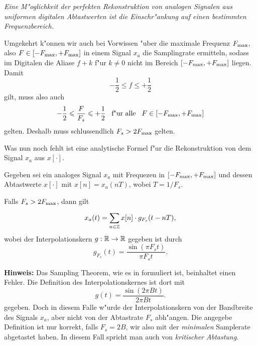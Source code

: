 \emph{Eine M"oglichkeit der perfekten Rekonstruktion von analogen Signalen aus uniformen digitalen Abtastwerten ist die Einschr"ankung auf einen bestimmten Frequenzbereich.}

Umgekehrt k"onnen wir auch bei Vorwissen "uber die maximale Frequenz $F_{\rm max}$, also $F \in [-F_{\rm max},+F_{\rm max}]$ in einem Signal $x_a$ die Samplingrate ermitteln, sodass im Digitalen die Aliase $f + k$ f"ur $k \neq 0$ nicht im Bereich $[-F_{\rm max},+F_{\rm max}]$ liegen.
Damit
\[
    -\frac 12 \leqslant f \leqslant + \frac 12
\]
gilt, muss also auch
\[
    -\frac 12 \leqslant \frac{F}{F_s} \leqslant + \frac 12 {\hspace{3mm} \text{f"ur alle} \hspace{3mm}} F \in [-F_{\rm max},+F_{\rm max}]
\]
gelten.
Deshalb muss schlussendlich $F_s > 2 F_{\rm max}$ gelten.

Was nun noch fehlt ist eine analytische Formel f"ur die Rekonstruktion von dem Signal $x_a$ aus $x[\cdot]$.
\begin{Thm}\label{stm:sampling_theorem}
Gegeben sei ein analoges Signal $x_a$ mit Frequezen in $[-F_{\rm max},+F_{\rm max}]$ und dessen Abtastwerte $x[\cdot]$ mit $x[n] = x_a(nT)$, wobei $T = 1/F_s$.

Falls $F_s > 2 F_{\rm max}$, dann gilt
\begin{equation}\label{eq:sampling_theorem}
    x_a(t) = {\sum\limits_{n \in \mathbb{Z}}^{}{
        x[n] \cdot g_{F_s}(t - n T),
    }}
\end{equation}
wobei der Interpolationskern $g : \mathbb{R} \rightarrow \mathbb{R}$ gegeben ist durch
\[
g_{F_s}(t) = \frac{\sin(\pi F_s t)}{\pi F_s t}.
\]
\end{Thm}

\textbf{Hinweis:} Das Sampling Theorem, wie es in \cite{proakis2013} formuliert ist, beinhaltet einen Fehler. Die Definition des Interpolationskernes ist dort mit
\[
g(t) = \frac{\sin(2 \pi B t)}{2 \pi B t}.
\]
gegeben. Doch in diesem Falle w"urde der Interpolationskern von der Bandbreite des Signals $x_a$, aber nicht von der Abtastrate $F_s$ abh"angen. 
Die angegebe Definition ist nur korrekt, falls $F_s = 2 B$, wir also mit der \emph{minimalen} Samplerate abgetastet haben.
In diesem Fall spricht man auch von \emph{kritischer Abtastung}.

